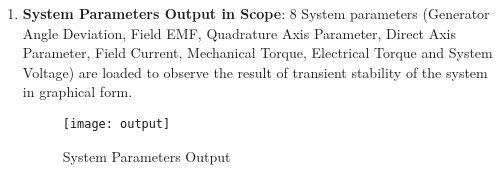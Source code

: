 \begin{enumerate}
%		
%		
%		

\item \textbf{\large System Parameters Output in Scope}: 8 System parameters (Generator Angle Deviation, Field EMF, Quadrature Axis Parameter, Direct Axis Parameter, Field Current, Mechanical Torque, Electrical Torque and System Voltage) are loaded to observe the result of transient stability of the system in graphical form.
	
	\begin{figure}[H]
	 \centering
	\texttt{[image: output]}
	\caption{System Parameters Output}
	\label{System Parameters Output}
	\end{figure}	
	
	
\end{enumerate}


